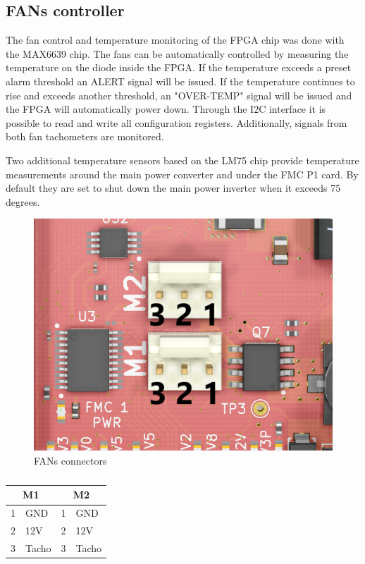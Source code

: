 \documentclass[12pt,oneside,a4]{article}
\begin{document}
\subsection{FANs controller}
The fan control and temperature monitoring of the FPGA chip was done with the MAX6639 chip. The fans can be automatically controlled by measuring the temperature on the diode inside the FPGA. If the temperature exceeds a preset alarm threshold an ALERT signal will be issued. If the temperature continues to rise and exceeds another threshold, an "OVER-TEMP" signal will be issued and the FPGA will automatically power down. Through the I2C interface it is possible to read and write all configuration registers. Additionally, signals from both fan tachometers are monitored. 

Two additional temperature sensors based on the LM75 chip provide temperature measurements around the main power converter and under the FMC P1 card. By default they are set to shut down the main power inverter when it exceeds 75 degrees.  

\begin{figure}[H]
\begin{center}
\includegraphics[width=0.6\linewidth]{fans.png}
 \caption{FANs connectors}\label{fans}
\end{center}
\end{figure}

\begin{table}[htbp]
\centering
\begin{tabular}{@{}llll@{}}
\toprule
\multicolumn{2}{c}{\textbf{M1}} & \multicolumn{2}{c}{\textbf{M2}} \\ \midrule
1            & GND              & 1            & GND              \\
2            & 12V              & 2            & 12V              \\
3            & Tacho            & 3            & Tacho            \\ \bottomrule
\end{tabular}
\caption{}
\label{tab:my-table}
\end{table}
\end{document}
